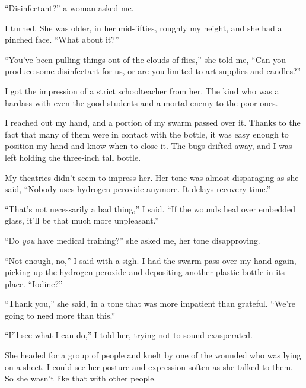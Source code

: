 ``Disinfectant?'' a woman asked me.



I turned.  She was older, in her mid-fifties, roughly my height, and she had a pinched face. ``What about it?''



``You've been pulling things out of the clouds of flies,'' she told me, ``Can you produce some disinfectant for us, or are you limited to art supplies and candles?''



I got the impression of a strict schoolteacher from her.  The kind who was a hardass with even the good students and a mortal enemy to the poor ones.



I reached out my hand, and a portion of my swarm passed over it.  Thanks to the fact that many of them were in contact with the bottle, it was easy enough to position my hand and know when to close it.  The bugs drifted away, and I was left holding the three-inch tall bottle.



My theatrics didn't seem to impress her.  Her tone was almost disparaging as she said, ``Nobody uses hydrogen peroxide anymore.  It delays recovery time.''



``That's not necessarily a bad thing,'' I said.  ``If the wounds heal over embedded glass, it'll be that much more unpleasant.''



``Do \emph{you} have medical training?'' she asked me, her tone disapproving.



``Not enough, no,'' I said with a sigh.  I had the swarm pass over my hand again, picking up the hydrogen peroxide and depositing another plastic bottle in its place.  ``Iodine?''



``Thank you,'' she said, in a tone that was more impatient than grateful.  ``We're going to need more than this.''



``I'll see what I can do,'' I told her, trying not to sound exasperated.



She headed for a group of people and knelt by one of the wounded who was lying on a sheet.  I could see her posture and expression soften as she talked to them.  So she wasn't like that with other people.



